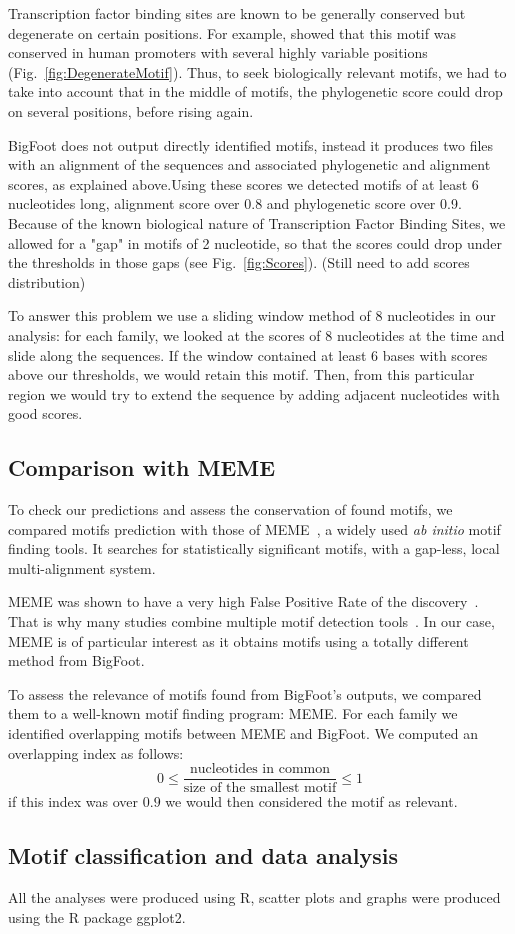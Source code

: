 Transcription factor binding sites are known to be generally conserved but degenerate on certain positions. For example, \citealt{whitfield_functional_2012} showed that this motif was conserved in human promoters with several highly variable positions (Fig.~\ref{fig:DegenerateMotif}). Thus, to seek biologically relevant motifs, we had to take into account that in the middle of motifs, the phylogenetic score could drop on several positions, before rising again.

BigFoot does not output directly identified motifs, instead it produces two files with an alignment of the sequences and associated phylogenetic and alignment scores, as explained above.Using these scores we detected motifs of at least 6 nucleotides long, alignment score over 0.8 and phylogenetic score over 0.9. Because of the known biological nature of Transcription Factor Binding Sites, we allowed for a "gap" in motifs of 2 nucleotide, so that the scores could drop under the thresholds in those gaps (see Fig.~\ref{fig:Scores}). (Still need to add scores distribution)

To answer this problem we use a sliding window method of 8 nucleotides in our analysis: for each family, we looked at the scores of 8 nucleotides at the time and slide along the sequences. If the window contained at least 6 bases with scores above our thresholds, we would retain this motif. Then, from this particular region we would try to extend the sequence by adding adjacent nucleotides with good scores.

\subsection*{Comparison with MEME}

To check our predictions and assess the conservation of found motifs, we compared motifs prediction with those of MEME~\citep{bailey_meme:_2006}, a widely used \textit{ab initio} motif finding tools. It searches for statistically significant motifs, with a gap-less, local multi-alignment system.

MEME was shown to have a very high False Positive Rate of the discovery~\citep{zia_towards_2012}. That is why many studies combine multiple motif detection tools~\citep{liseron-monfils_promzea:_2013}. In our case, MEME is of particular interest as it obtains motifs using a totally different method from BigFoot.

To assess the relevance of motifs found from BigFoot's outputs, we compared them to a well-known motif finding program: MEME. For each family we identified overlapping motifs between MEME and BigFoot. We computed an overlapping index as follows: 
\begin{equation}
0 \leq \frac{\text{nucleotides in common}}{\text{size of the smallest motif}} \leq 1
\end{equation}
if this index was over $0.9$ we would then considered the motif as relevant.

\subsection*{Motif classification and data analysis}

All the analyses were produced using R, scatter plots and graphs were produced using the R package ggplot2.

